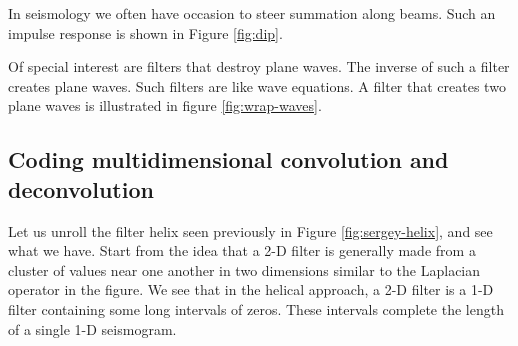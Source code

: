 \par
In seismology we often have occasion to steer summation along beams.
Such an impulse response is shown in Figure \ref{fig:dip}.


Of special interest are filters that destroy plane waves.  The inverse
of such a filter creates plane waves.  Such filters are like wave
equations.  A filter that creates two plane waves is illustrated in
figure \ref{fig:wrap-waves}.



\subsection{Coding multidimensional convolution and deconvolution}
Let us unroll the filter helix seen previously in Figure \ref{fig:sergey-helix},
and see what we have.
Start from the idea that a 2-D filter is generally made
from a cluster of values near one another in two dimensions
similar to the Laplacian operator in the figure.
We see that in the helical approach,
a 2-D filter is a 1-D filter containing some long intervals of zeros.
These intervals complete the length of a single 1-D seismogram.

